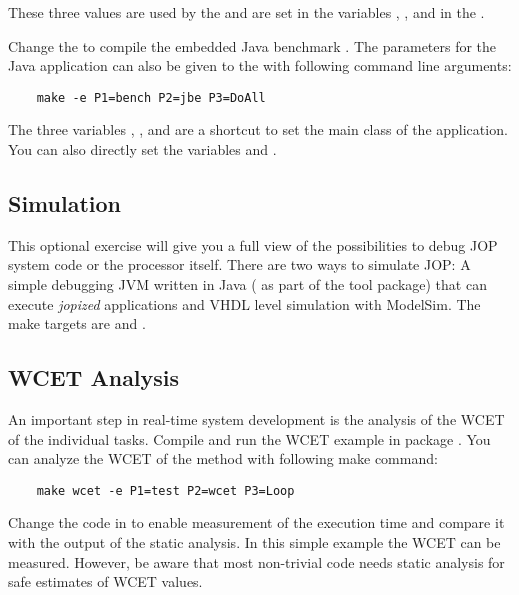 These three values are used by the  and are set in the
variables , , and  in the
.

Change the  to compile the embedded Java benchmark
. The parameters for the Java application can also
be given to the  with following command line arguments:
\begin{verbatim}
    make -e P1=bench P2=jbe P3=DoAll
\end{verbatim}

The three variables , , and  are a
shortcut to set the main class of the application. You can also
directly set the variables  and
.


\subsection{Simulation}

This optional exercise will give you a full view of the possibilities
to debug JOP system code or the processor itself. There are two ways
to simulate JOP: A simple debugging JVM written in Java
( as part of the tool package) that can execute
\emph{jopized} applications and VHDL level simulation with ModelSim.
The make targets are  and .

\subsection{WCET Analysis}

An important step in real-time system development is the analysis of
the WCET of the individual tasks. Compile and run the WCET example
 in package . You can analyze the WCET of
the method  with following make command:
\begin{verbatim}
    make wcet -e P1=test P2=wcet P3=Loop
\end{verbatim}
Change the code in  to enable measurement of the
execution time and compare it with the output of the static analysis.
In this simple example the WCET can be measured. However, be aware
that most non-trivial code needs static analysis for safe estimates
of WCET values.
